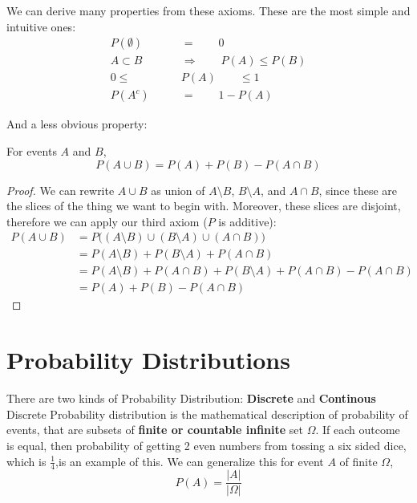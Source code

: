 \par
We can derive many properties from these axioms. These are the most simple and intuitive ones:
$$
\begin{aligned}
    P(\emptyset) \qquad &= \qquad 0 \\
    A \subset B \qquad &\Longrightarrow  \qquad P(A) \le P(B) \\
    0 \le       \qquad &P(A) \qquad \le 1 \\
    P(A^c)  \qquad  & = \qquad 1- P(A)
\end{aligned}$$

And a less obvious property:
\begin{lemma} For  events $A$ and $B$,
    $$ P \left(A \cup B\right)= P(A)+P(B)-P(A \cap B)$$
\end{lemma}

\begin{proof}
    We can rewrite $A \cup B$ as union of $A \setminus B$, $B \setminus A$, and $A \cap B$, since these are the slices of the thing we want
    to begin with. Moreover, these slices are disjoint, therefore we can apply our third axiom ($P$ is additive):
    $$
    \begin{aligned}
        P \left(A \cup B\right) &= P \bigl( (A \setminus B) \cup (B \setminus A) \cup (A \cap B) \bigr) \\
        &= P(A \setminus B) + P( B \setminus A) + P(A \cap B)  \\
        &= P(A \setminus B) + P( A \cap B)+ P( B \setminus A) + P(A \cap B) - P(A \cap B)  \\
        &= P(A)+P(B)-P(A \cap B)
    \end{aligned}
    $$
\end{proof}


\section{Probability Distributions}
There are two kinds of Probability Distribution: \textbf{Discrete} and \textbf{Continous}
Discrete Probability distribution is the mathematical  description of probability of events, that are subsets of \textbf{finite or
countable infinite} set $\Omega$.
If each outcome is equal, then probability of getting 2 even numbers from tossing a six sided dice, which is $\frac{1}{4}$,is an example of
this. We can generalize this for event $A$ of finite $\Omega$,
$$ P(A) = \frac{|A|}{|\Omega |}$$

